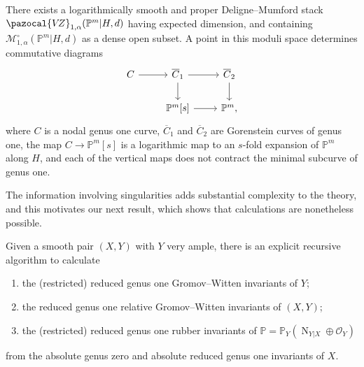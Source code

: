 \documentclass[11pt]{amsart}
\newcommand{\PP}{\mathbb P}
\newcommand{\VZ}{\pazocal{V\!Z}}
\newcommand{\OO}{\mathcal{O}}
\renewcommand{\to}{\rightarrow}
\theoremstyle{definition}
\newenvironment{customthm}[1]
  {\renewcommand\theinnercustomthm{#1}\innercustomthm}
  {\endinnercustomthm}
\theoremstyle{definition}
\begin{document}
\begin{customthm}{A}\label{thm: desingularization}
There exists a logarithmically smooth and proper Deligne--Mumford stack $\VZ_{1,\alpha}(\mathbb P^m|H,d)$ having expected dimension, and containing $\mathcal M_{1,\alpha}^\circ(\mathbb P^m|H,d)$  as a dense open subset. A point in this moduli space determines commutative diagrams
\[
\begin{tikzcd}
C\arrow{r} & \overline C_1\arrow{d}\arrow{r} & \overline C_2\arrow{d} \\ 
& \mathbb P^m[s]\arrow{r} & \mathbb P^m,
\end{tikzcd}
\]
where $C$ is a nodal genus one curve, $\overline C_1$ and $\overline C_2$ are Gorenstein curves of genus one, the map $C\to \PP^m[s]$ is a logarithmic map to an $s$-fold expansion of $\PP^m$ along $H$, and each of the vertical maps does not contract the minimal subcurve of genus one.
\end{customthm}



The information involving singularities adds substantial complexity to the theory, and this motivates our next result, which shows that calculations are nonetheless possible. 

\begin{customthm}{B}\label{thm: recursion}
Given a smooth pair $(X,Y)$ with $Y$ very ample, there is an explicit recursive algorithm to calculate
\begin{enumerate}
\item the (restricted) reduced genus one Gromov--Witten invariants of $Y$;
\item the reduced genus one relative Gromov--Witten invariants of $(X,Y)$; 
\item the (restricted) reduced genus one rubber invariants of $\mathbb{P}=\PP_Y(\operatorname{N}_{Y|X} \oplus \OO_Y)$
\end{enumerate}
from the absolute genus zero and absolute reduced genus one invariants of $X$.
\end{customthm}
\end{document}
